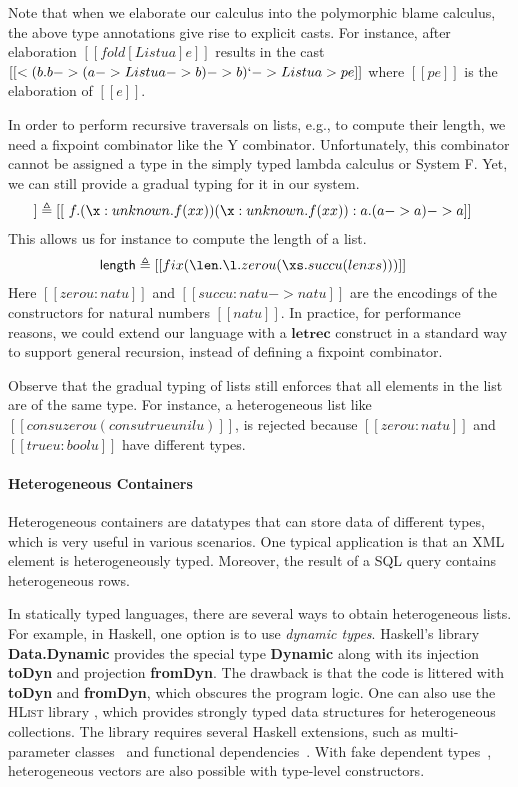 Note that when we elaborate our calculus into the polymorphic blame calculus, the above
type annotations give rise to explicit casts. For
instance, after elaboration $[[ fold [Listu a] e   ]]$ results in the cast 
$ [[< (\/b . b -> (a -> Listu a -> b) -> b) `-> Listu a > pe]] $ where $[[pe]]$ is the elaboration of $[[e]]$.

In order to perform recursive traversals on lists, e.g., to compute their
length, we need a fixpoint combinator like the Y combinator. Unfortunately, this combinator
cannot be assigned a type in the simply typed lambda calculus or System F.
Yet, we can still provide a gradual typing for it in our system.
\begin{align*}
[[fix]] &\triangleq [[  \ f . (\x : unknown . f (x x)) (\x : unknown . f (x x)) : \/ a. (a -> a) -> a ]]
\end{align*}
This allows us for instance to compute the length of a list.
\begin{align*}
\mathsf{length} &\triangleq [[  fix ( \len . \l . zerou (\xs . succu (len xs)))  ]]
\end{align*}
Here $[[ zerou : natu  ]]$ and $[[ succu : natu -> natu    ]]$
are the encodings of the constructors for natural numbers $[[ natu
]]$. In practice, 
for performance reasons, we could extend our
language with a $\mathbf{letrec}$ construct in a standard way to
support general recursion, instead of defining a fixpoint combinator.


Observe that the gradual typing of lists still enforces that all
elements in the list are
of the same type. For instance, a heterogeneous list like
$[[  consu zerou (consu trueu nilu)    ]]$,
is rejected because $[[ zerou : natu    ]]$ and $[[ trueu : boolu  ]]$ have different types.

\paragraph{Heterogeneous Containers}
Heterogeneous containers are datatypes that can store data of different types,
which is very useful in various scenarios. One typical application is that an
XML element is heterogeneously typed. Moreover, the result of a SQL query
contains heterogeneous rows.

In statically typed languages, there are several ways to obtain heterogeneous lists. For example, in Haskell, one option is
to use \emph{dynamic types}. Haskell's library \textbf{Data.Dynamic} provides the
special type \textbf{Dynamic} along with its injection \textbf{toDyn} and
projection \textbf{fromDyn}. The drawback is that the code is littered with
\textbf{toDyn} and \textbf{fromDyn}, which obscures the program logic.
One can also use the \textsc{HList} library
\citep{kiselyov2004strongly}, which provides strongly typed data structures for
heterogeneous collections. The library requires several Haskell extensions, such as multi-parameter classes~\citep{jones1997type} and
functional dependencies~\citep{jones2000type}.
With fake dependent
types~\citep{mcbride2002faking}, heterogeneous vectors are also possible with
type-level constructors.

